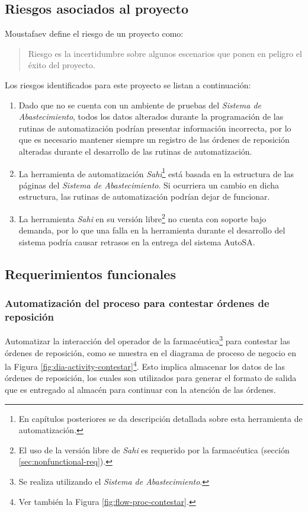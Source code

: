 \subsection{Riesgos asociados al proyecto}\label{sec:riesgos}
Moustafaev\cite{ScopeManagement} define el riesgo de un proyecto como:
\begin{quote}
Riesgo es la incertidumbre sobre algunos escenarios que ponen en peligro el éxito del proyecto.
\end{quote}
Los riesgos identificados para este proyecto se listan a continuación:
\begin{enumerate}
  \item Dado que no se cuenta con un ambiente de pruebas del \textit{Sistema de Abastecimiento}, todos los datos alterados durante la programación de las rutinas de automatización podrían presentar información incorrecta, por lo que es necesario mantener siempre un registro de las órdenes de reposición alteradas durante el desarrollo de las rutinas de automatización.
  \item La herramienta de automatización \textit{Sahi}\footnote{En capítulos posteriores se da descripción detallada sobre esta herramienta de automatización.} está basada en la estructura de las páginas del \textit{Sistema de Abastecimiento}. Si ocurriera un cambio en dicha estructura, las rutinas de automatización podrían dejar de funcionar.
  \item La herramienta \textit{Sahi} en su versión libre\footnote{El uso de la versión libre de \textit{Sahi} es requerido por la farmacéutica (sección \ref{sec:nonfunctional-req}).} no cuenta con soporte bajo demanda, por lo que una falla en la herramienta durante el desarrollo del sistema podría causar retrasos en la entrega del sistema AutoSA.
\end{enumerate}


\subsection{Requerimientos funcionales}\label{sec:req-fun}
\subsubsection{Automatización del proceso para contestar órdenes de reposición}\label{sec:req-contestar}
Automatizar la interacción del operador de la farmacéutica\footnote{Se realiza utilizando el \textit{Sistema de Abastecimiento}.} para contestar las órdenes de reposición, como se muestra en el diagrama de proceso de negocio en la Figura \ref{fig:dia-activity-contestar}\footnote{Ver también la Figura \ref{fig:flow-proc-contestar}.}. Esto implica almacenar los datos de las órdenes de reposición, los cuales son utilizados para generar el formato de salida que es entregado al almacén para continuar con la atención de las órdenes.

